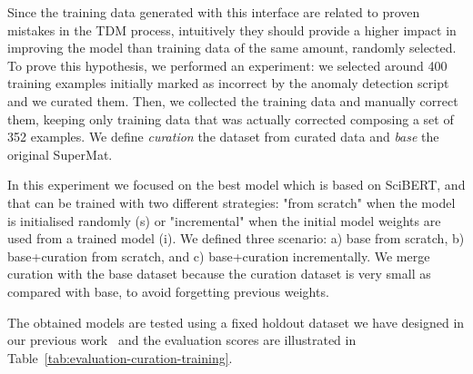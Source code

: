 \documentclass[a4paper]{article}
\begin{document}
Since the training data generated with this interface are related to proven mistakes in the TDM process, intuitively they should provide a higher impact in improving the model than training data of the same amount, randomly selected.
To prove this hypothesis, we performed an experiment: we selected around 400 training examples initially marked as incorrect by the anomaly detection script and we curated them. 
Then, we collected the training data and manually correct them, keeping only training data that was actually corrected composing a set of 352 examples. We define \textit{curation} the dataset from curated data and \textit{base} the original SuperMat.

In this experiment we focused on the best model which is based on SciBERT, and that can be trained with two different strategies: "from scratch" when the model is initialised randomly (s) or "incremental" when the initial model weights are used from a trained model (i).
We defined three scenario: a) base from scratch, b) base+curation from scratch, and c) base+curation incrementally. 
We merge curation with the base dataset because the curation dataset is very small as compared with base, to avoid forgetting previous weights.  

The obtained models are tested using a fixed holdout dataset we have designed in our previous work~\cite{lfoppiano2023automatic} and the evaluation scores are illustrated in Table~\ref{tab:evaluation-curation-training}.
\end{document}
